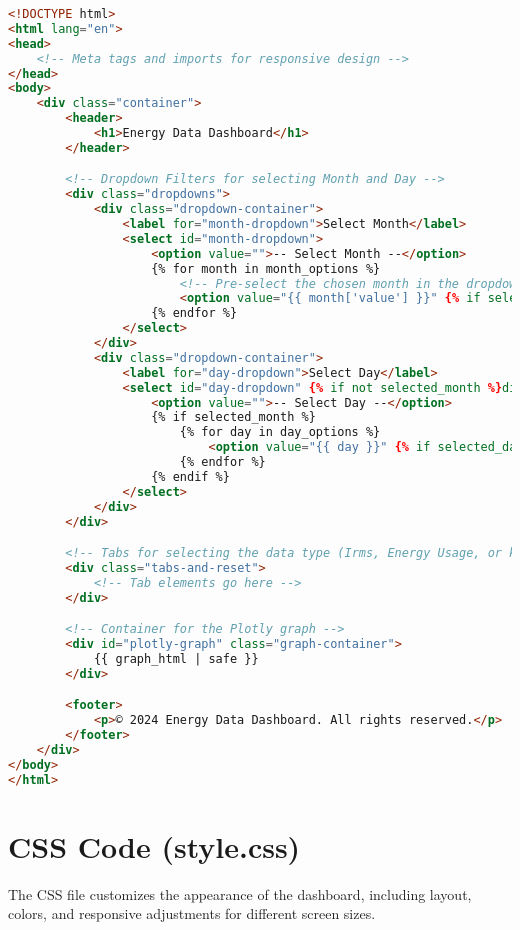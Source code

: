 \begin{lstlisting}[language=HTML, caption=index.html, frame=single]
<!DOCTYPE html>
<html lang="en">
<head>
    <!-- Meta tags and imports for responsive design -->
</head>
<body>
    <div class="container">
        <header>
            <h1>Energy Data Dashboard</h1>
        </header>

        <!-- Dropdown Filters for selecting Month and Day -->
        <div class="dropdowns">
            <div class="dropdown-container">
                <label for="month-dropdown">Select Month</label>
                <select id="month-dropdown">
                    <option value="">-- Select Month --</option>
                    {% for month in month_options %}
                        <!-- Pre-select the chosen month in the dropdown -->
                        <option value="{{ month['value'] }}" {% if selected_month == month['value'] %}selected{% endif %}>{{ month['label'] }}</option>
                    {% endfor %}
                </select>
            </div>
            <div class="dropdown-container">
                <label for="day-dropdown">Select Day</label>
                <select id="day-dropdown" {% if not selected_month %}disabled{% endif %}>
                    <option value="">-- Select Day --</option>
                    {% if selected_month %}
                        {% for day in day_options %}
                            <option value="{{ day }}" {% if selected_day == day %}selected{% endif %}>Day {{ day }}</option>
                        {% endfor %}
                    {% endif %}
                </select>
            </div>
        </div>

        <!-- Tabs for selecting the data type (Irms, Energy Usage, or kWh) -->
        <div class="tabs-and-reset">
            <!-- Tab elements go here -->
        </div>

        <!-- Container for the Plotly graph -->
        <div id="plotly-graph" class="graph-container">
            {{ graph_html | safe }}
        </div>

        <footer>
            <p>© 2024 Energy Data Dashboard. All rights reserved.</p>
        </footer>
    </div>
</body>
</html>
\end{lstlisting}

\section{CSS Code (style.css)}

The CSS file customizes the appearance of the dashboard, including layout, colors, and responsive adjustments for different screen sizes.

